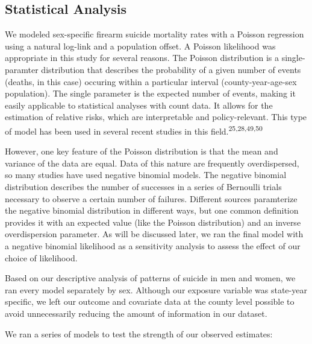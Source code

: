 \documentclass[]{article}
\begin{document}
\subsection{Statistical Analysis}\label{statistical-analysis}

We modeled sex-specific firearm suicide mortality rates with a Poisson
regression using a natural log-link and a population offset. A Poisson
likelihood was appropriate in this study for several reasons. The
Poisson distribution is a single-paramter distribution that describes
the probability of a given number of events (deaths, in this case)
occuring within a particular interval (county-year-age-sex population).
The single parameter is the expected number of events, making it easily
applicable to statistical analyses with count data. It allows for the
estimation of relative risks, which are interpretable and
policy-relevant. This type of model has been used in several recent
studies in this field.\textsuperscript{25,28,49,50}

However, one key feature of the Poisson distribution is that the mean
and variance of the data are equal. Data of this nature are frequently
overdispersed, so many studies have used negative binomial models. The
negative binomial distribution describes the number of successes in a
series of Bernoulli trials necessary to observe a certain number of
failures. Different sources paramterize the negative binomial
distribution in different ways, but one common definition provides it
with an expected value (like the Poisson distribution) and an inverse
overdispersion parameter. As will be discussed later, we ran the final
model with a negative binomial likelihood as a sensitivity analysis to
assess the effect of our choice of likelihood.

Based on our descriptive analysis of patterns of suicide in men and
women, we ran every model separately by sex. Although our exposure
variable was state-year specific, we left our outcome and covariate data
at the county level possible to avoid unnecessarily reducing the amount
of information in our dataset.

We ran a series of models to test the strength of our observed
estimates:
\end{document}
